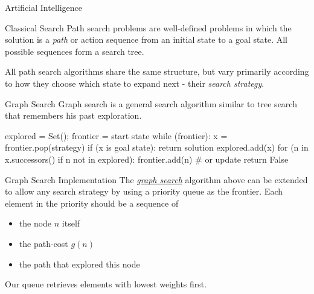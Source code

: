 \documentclass{cognito}
\begin{document}
\lstset{language=Python}
\lstset{mathescape=true}


\begin{note}{Artificial Intelligence}
\end{note}



\begin{note}{Classical Search}
	Path search problems are well-defined problems in which the solution is a \emph{path}
	or action sequence from an initial state to a goal state. All possible
	sequences form a search tree.
	\vspace{5pt}
	
	All path search algorithms share the same structure, but vary primarily
	according to how they choose which state to expand next - their \emph{search strategy}.
\end{note}


\begin{note}{Graph Search}
	Graph search is a general search algorithm
	similar to  tree search that remembers his past exploration.
	\begin{code}
explored = Set(); frontier = {start state}
while (frontier):
 	x = frontier.pop(strategy)
	if (x is goal state): return solution
	explored.add(x)
	for (n in x.successors() if n not in explored):
		frontier.add(n)  # or update
return False
	\end{code}
\end{note}

\begin{note}{Graph Search Implementation}
	The \hyperref[note:Graph Search]{\emph{graph search}} algorithm above can be extended to allow any 
	search strategy by using a priority queue as the frontier. Each element in the
	priority should be a sequence of
	\begin{itemize}
		\item the node $n$ itself
		\item the path-cost $g(n)$
		\item the path that explored this node
	\end{itemize}
	\begin{remark} Our queue retrieves elements with lowest weights first.
	\end{remark}
	\vspace{-5pt}
\end{note}
\end{document}
